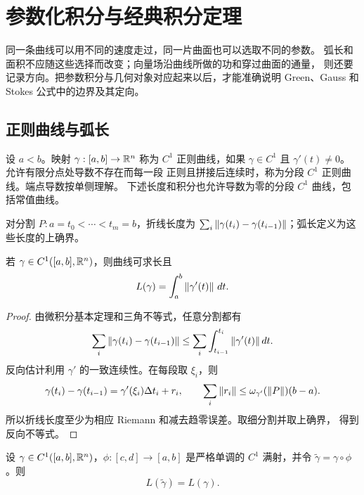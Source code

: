\chapter{参数化积分与经典积分定理}
\label{chap:parametric-classical-integrals}
\label{chap:parametric-integrals}
\label{chap:classical-integral-theorems}

同一条曲线可以用不同的速度走过，同一片曲面也可以选取不同的参数。
弧长和面积不应随这些选择而改变；向量场沿曲线所做的功和穿过曲面的通量，
则还要记录方向。把参数积分与几何对象对应起来以后，才能准确说明
Green、Gauss 和 Stokes 公式中的边界及其定向。

\section{正则曲线与弧长}

\begin{definition}
设 $a<b$。映射 $\gamma:[a,b]\to\mathbb{R}^n$ 称为 $C^1$ 正则曲线，如果
$\gamma\in C^1$ 且 $\gamma'(t)\ne0$。允许有限分点处导数不存在而每一段
正则且拼接后连续时，称为分段 $C^1$ 正则曲线。端点导数按单侧理解。
下述长度和积分也允许导数为零的分段 $C^1$ 曲线，包括常值曲线。
\end{definition}

对分割 $P:a=t_0<\cdots<t_m=b$，折线长度为
$\sum_i\left\lVert\gamma(t_i)-\gamma(t_{i-1})\right\rVert$；弧长定义为这些长度的上确界。

\begin{theorem}[弧长公式]
\label{thm:arc-length-parametric}
若 $\gamma\in C^1([a,b],\mathbb{R}^n)$，则曲线可求长且
\[
 L(\gamma)=\int_a^b\left\lVert\gamma'(t)\right\rVert\,dt.
\]
\end{theorem}

\begin{proof}
由微积分基本定理和三角不等式，任意分割都有
\[
 \sum_i\left\lVert\gamma(t_i)-\gamma(t_{i-1})\right\rVert
 \le\sum_i\int_{t_{i-1}}^{t_i}\left\lVert\gamma'(t)\right\rVert dt.
\]
反向估计利用 $\gamma'$ 的一致连续性。在每段取 $\xi_i$，则
\[
 \gamma(t_i)-\gamma(t_{i-1})
 =\gamma'(\xi_i)\Delta t_i+r_i,
 \qquad \sum_i\left\lVert r_i\right\rVert\le\omega_{\gamma'}(\left\lVert P\right\rVert)(b-a).
\]
所以折线长度至少为相应 Riemann 和减去趋零误差。取细分割并取上确界，
得到反向不等式。
\end{proof}

\begin{theorem}[曲线的重新参数化]
\label{thm:curve-reparametrization}
设 $\gamma\in C^1([a,b],\mathbb{R}^n)$，$\phi:[c,d]\to[a,b]$ 是严格单调的
$C^1$ 满射，并令
$\widetilde\gamma=\gamma\circ\phi$。则
\[
 L(\widetilde\gamma)=L(\gamma).
\]
\end{theorem}

